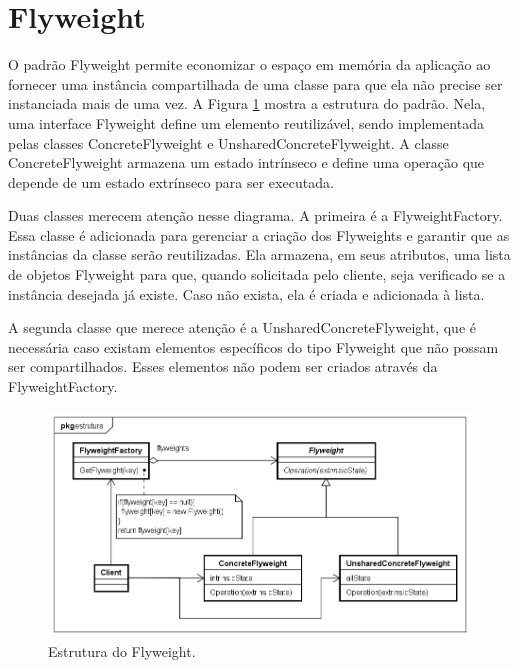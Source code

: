 \section{Flyweight}

O padrão Flyweight permite economizar o espaço em memória 
da aplicação ao fornecer uma instância compartilhada de 
uma classe para que ela não precise ser instanciada 
mais de uma vez. A Figura \ref{flyweight_struct} mostra 
a estrutura do padrão. Nela, uma interface Flyweight 
define um elemento reutilizável, sendo implementada 
pelas classes ConcreteFlyweight e UnsharedConcreteFlyweight. 
A classe ConcreteFlyweight armazena um estado intrínseco 
e define uma operação que depende de um estado extrínseco 
para ser executada. \cite{gamma:1995}

Duas classes merecem atenção nesse diagrama. A primeira 
é a FlyweightFactory. Essa classe é adicionada para 
gerenciar a criação dos Flyweights e garantir que as 
instâncias da classe serão reutilizadas. Ela armazena, em 
seus atributos, uma lista de objetos Flyweight para que,  
quando solicitada pelo cliente, seja verificado se a instância 
desejada já existe. Caso não exista, ela é criada e 
adicionada à lista. 

A segunda classe que merece atenção é a UnsharedConcreteFlyweight, 
que é necessária caso existam elementos específicos 
do tipo Flyweight que não possam ser compartilhados. 
Esses elementos não podem ser criados através da 
FlyweightFactory.

\begin{figure}[htb]
	\caption{\label{flyweight_struct}Estrutura do Flyweight.}
	\begin{center}
	    \includegraphics[scale=0.5]{5_padroes-contexto-funcional/5.2_estruturais/5.2.6_flyweight/flyweight_estrutura.png}
	\end{center}
\end{figure}

